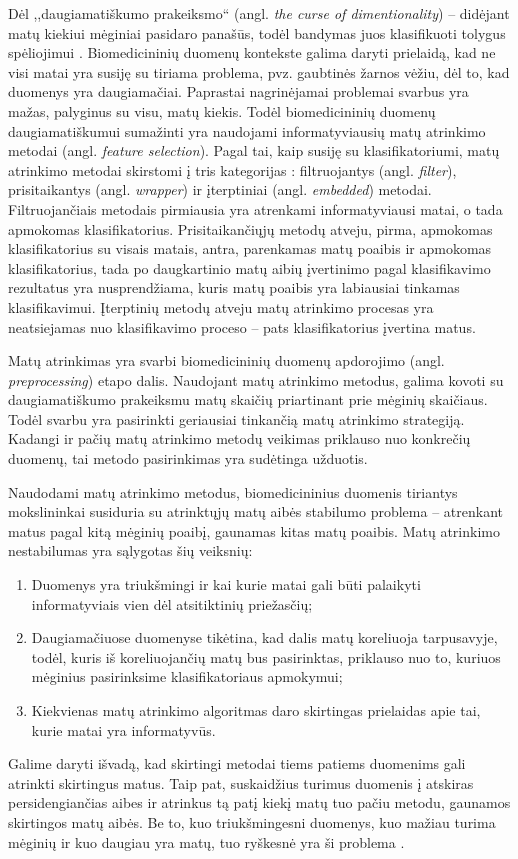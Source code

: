 Dėl ,,daugiamatiškumo prakeiksmo`` (angl. \textit{the curse of dimentionality}) -- didėjant matų kiekiui mėginiai pasidaro panašūs, todėl bandymas juos klasifikuoti tolygus spėliojimui \cite{bellman1966adaptive}. Biomedicininių duomenų kontekste galima daryti prielaidą, kad ne visi matai yra susiję su tiriama problema, pvz. gaubtinės žarnos vėžiu, dėl to, kad duomenys yra daugiamačiai. Paprastai nagrinėjamai problemai svarbus yra mažas, palyginus su visu, matų kiekis.  Todėl biomedicininių duomenų daugiamatiškumui sumažinti yra naudojami informatyviausių matų atrinkimo metodai \cite{guyon2003introduction} (angl. \textit{feature selection}). Pagal tai, kaip susiję su klasifikatoriumi, matų atrinkimo metodai skirstomi į tris kategorijas \cite{saeys2008robust}: filtruojantys (angl. \textit{filter}), prisitaikantys (angl. \textit{wrapper}) ir įterptiniai (angl. \textit{embedded}) metodai. Filtruojančiais metodais pirmiausia yra atrenkami informatyviausi matai, o tada apmokomas klasifikatorius. Prisitaikančiųjų 
metodų atveju, pirma, apmokomas klasifikatorius su visais matais, antra, parenkamas matų poaibis ir apmokomas klasifikatorius, tada po daugkartinio matų aibių įvertinimo pagal klasifikavimo rezultatus yra nusprendžiama, kuris matų poaibis yra labiausiai tinkamas klasifikavimui. Įterptinių metodų atveju matų atrinkimo procesas yra neatsiejamas nuo klasifikavimo proceso -- pats klasifikatorius įvertina matus.

Matų atrinkimas yra svarbi biomedicininių duomenų apdorojimo (angl. \textit{preprocessing}) etapo dalis. Naudojant matų atrinkimo metodus, galima kovoti su daugiamatiškumo prakeiksmu matų skaičių priartinant prie mėginių skaičiaus. Todėl svarbu yra pasirinkti geriausiai tinkančią matų atrinkimo strategiją. Kadangi ir pačių matų atrinkimo metodų veikimas priklauso nuo konkrečių duomenų, tai metodo pasirinkimas yra sudėtinga užduotis.

Naudodami matų atrinkimo metodus, biomedicininius duomenis tiriantys mokslininkai susiduria su atrinktųjų matų aibės stabilumo problema -- atrenkant matus pagal kitą mėginių poaibį, gaunamas kitas matų poaibis. Matų atrinkimo nestabilumas yra sąlygotas šių veiksnių:
\begin{enumerate}
 \item Duomenys yra triukšmingi ir kai kurie matai gali būti palaikyti informatyviais vien dėl atsitiktinių priežasčių;
 \item Daugiamačiuose duomenyse tikėtina, kad dalis matų koreliuoja tarpusavyje, todėl, kuris iš koreliuojančių matų bus pasirinktas, priklauso nuo to, kuriuos mėginius pasirinksime klasifikatoriaus apmokymui;
 \item Kiekvienas matų atrinkimo algoritmas daro skirtingas prielaidas apie tai, kurie matai yra informatyvūs.
\end{enumerate}
Galime daryti išvadą, kad skirtingi metodai tiems patiems duomenims gali atrinkti skirtingus matus. Taip pat, suskaidžius turimus duomenis į atskiras persidengiančias aibes ir atrinkus tą patį kiekį matų tuo pačiu metodu, gaunamos skirtingos matų aibės. Be to, kuo triukšmingesni duomenys, kuo mažiau turima mėginių ir kuo daugiau yra matų, tuo ryškesnė yra ši problema \cite{loscalzo2009consensus}.

